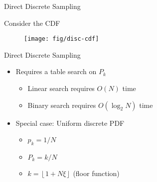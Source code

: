 \documentclass[xcolor=x11names,compress]{beamer}
\renewcommand{\(}{\begin{columns}}
\renewcommand{\)}{\end{columns}}
\newcommand{\<}[1]{\begin{column}{#1}}
\renewcommand{\>}{\end{column}}
\begin{document}
\begin{frame}{Direct Discrete Sampling}

\vspace*{1 em}
Consider the CDF

  	\begin{figure}
  	\begin{center}
  		\texttt{[image: fig/disc-cdf]}
	\end{center}
  	\end{figure}

\end{frame}


\begin{frame}{Direct Discrete Sampling}

    \begin{itemize}
    \item Requires a table search on $P_k$
      \begin{itemize}
      \item Linear search requires $O(N)$ time
      \item Binary search requires $O(\log_2 N)$ time
      \end{itemize}
    \vspace*{.5em}
    
    \item Special case: Uniform discrete PDF
      \begin{itemize}
      \item $p_k = 1/N$
      \item $P_k = k/N$
      \item $k = \left\lfloor{1 + N\xi}\right\rfloor$ (floor function)
      \end{itemize}
    \end{itemize}

\end{frame}
\end{document}
